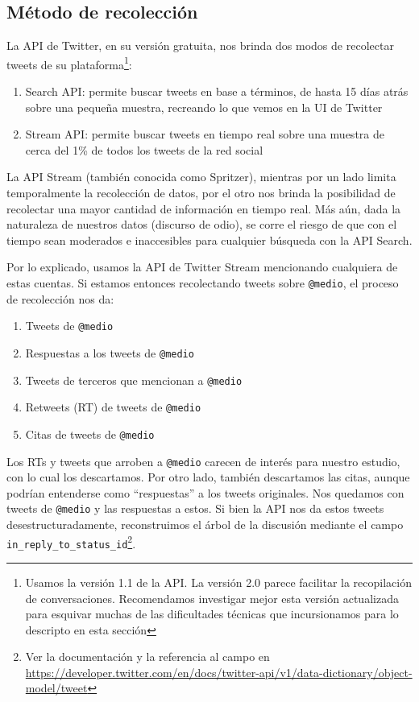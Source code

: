 \subsection{Método de recolección}



La API de Twitter, en su versión gratuita, nos brinda dos modos de recolectar tweets de su plataforma\footnote{Usamos la versión 1.1 de la API. La versión 2.0 parece facilitar la recopilación de conversaciones. Recomendamos investigar mejor esta versión actualizada para esquivar muchas de las dificultades técnicas que incursionamos para lo descripto en esta sección}:

\begin{enumerate}
    \item Search API: permite buscar tweets en base a términos, de hasta 15 días atrás sobre una pequeña muestra, recreando lo que vemos en la UI de Twitter
    \item Stream API: permite buscar tweets en tiempo real sobre una muestra de cerca del 1\% de todos los tweets de la red social
\end{enumerate}

La API Stream (también conocida como Spritzer), mientras por un lado limita temporalmente la recolección de datos, por el otro nos brinda la posibilidad de recolectar una mayor cantidad de información en tiempo real. Más aún, dada la naturaleza de nuestros datos (discurso de odio), se corre el riesgo de que con el tiempo sean moderados e inaccesibles para cualquier búsqueda con la API Search.

Por lo explicado, usamos la API de Twitter Stream mencionando cualquiera de estas cuentas. Si estamos entonces recolectando tweets sobre \verb|@medio|, el proceso de recolección nos da:

\begin{enumerate}
    \item Tweets de \verb|@medio|
    \item Respuestas a los tweets de \verb|@medio|
    \item Tweets de terceros que mencionan a \verb|@medio|
    \item Retweets (RT) de tweets de \verb|@medio|
    \item Citas de tweets de \verb|@medio|
\end{enumerate}

Los RTs y tweets que arroben a \verb|@medio| carecen de interés para nuestro estudio, con lo cual los descartamos. Por otro lado, también descartamos las citas, aunque podrían entenderse como ``respuestas'' a los tweets originales. Nos quedamos con tweets de \verb|@medio| y las respuestas a estos. Si bien la API nos da estos tweets desestructuradamente, reconstruimos el árbol de la discusión mediante el campo \verb|in_reply_to_status_id|\footnote{Ver la documentación y la referencia al campo en \url{https://developer.twitter.com/en/docs/twitter-api/v1/data-dictionary/object-model/tweet}}.

